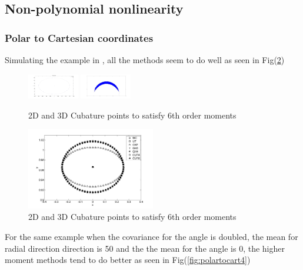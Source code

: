\documentclass[letterpaper, 10 pt, conference]{ieeeconf}  %
\begin{document}



\subsection{Non-polynomial nonlinearity}

\subsubsection{Polar to Cartesian coordinates}
Simulating the example in \cite{c8}, all the methods seem to do well as seen in Fig(\ref{fig:polartocart2})
   \begin{figure}[thpb]
      \centering
      \includegraphics[width=0.2\textwidth]{polartocart5}
      \includegraphics[width=0.2\textwidth]{polartocart4}
      \caption{2D and 3D Cubature points to satisfy 6th order moments}
      \label{fig:polartocart1}
   \end{figure}
      \begin{figure}[thpb]
      \centering
      \includegraphics[width=0.5\textwidth]{polartocart3}
      \caption{2D and 3D Cubature points to satisfy 6th order moments}
      \label{fig:polartocart2}
   \end{figure}  
For the same example when the covariance for the angle is doubled, the mean for radial direction direction is 50 and the the mean for the angle is 0, the higher moment methods tend to do better as seen in Fig(\ref{fig:polartocart4})
   
\end{document}
